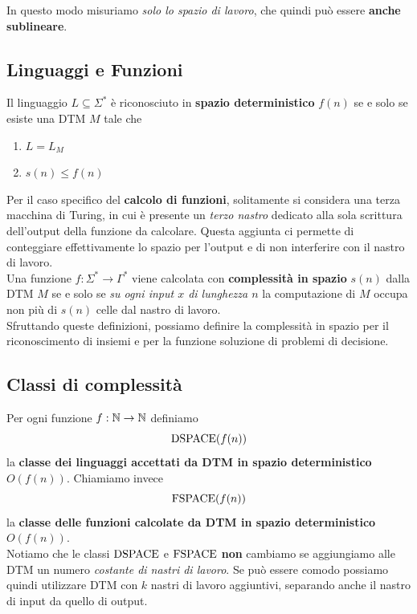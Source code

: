 In questo modo misuriamo \textit{solo lo spazio di lavoro}, che quindi può essere \textbf{anche sublineare}. \\

\subsection{Linguaggi e Funzioni}

Il linguaggio $L \subseteq \Sigma^\ast$ è riconosciuto in \textbf{spazio deterministico} $f(n)$ se e solo se esiste una DTM $M$ tale che
\begin{enumerate}
	\item $L = L_M$
	\item $s(n) \leq f(n)$
\end{enumerate}

Per il caso specifico del \textbf{calcolo di funzioni}, solitamente si considera una terza macchina di Turing, in cui è presente un \textit{terzo nastro} dedicato alla sola scrittura dell'output della funzione da calcolare. Questa aggiunta ci permette di conteggiare effettivamente lo spazio per l'output e di non interferire con il nastro di lavoro.\\

Una funzione $f: \Sigma^\ast \rightarrow \Gamma^\ast$ viene calcolata con \textbf{complessità in spazio} $s(n)$ dalla DTM $M$ se e solo se \textit{su ogni input $x$ di lunghezza $n$} la computazione di $M$ occupa non più di $s(n)$ celle dal nastro di lavoro.\\

Sfruttando queste definizioni, possiamo definire la complessità in spazio per il riconoscimento di insiemi e per la funzione soluzione di problemi di decisione.\\

\subsection{Classi di complessità}

Per ogni funzione $f: \mathbb{N} \rightarrow \mathbb{N}$ definiamo 
$$ \text{DSPACE} (f(n)) $$
la \textbf{classe dei linguaggi accettati da DTM in spazio deterministico} $O(f(n))$. Chiamiamo invece
$$ \text{FSPACE} (f(n)) $$
la \textbf{classe delle funzioni calcolate da DTM in spazio deterministico} $O(f(n))$.\\

Notiamo che le classi $\text{DSPACE}$ e $\text{FSPACE}$ \textbf{non} cambiamo se aggiungiamo alle DTM un numero \textit{costante di nastri di lavoro}. Se può essere comodo possiamo quindi utilizzare DTM con $k$ nastri di lavoro aggiuntivi, separando anche il nastro di input da quello di output.\\

